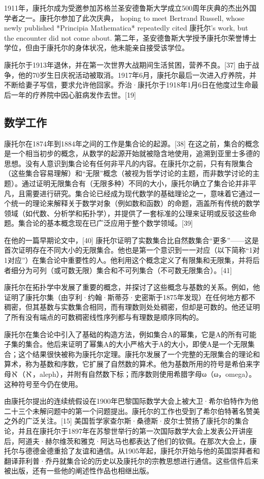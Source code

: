1911年，康托尔成为受邀参加苏格兰圣安德鲁斯大学成立500周年庆典的杰出外国学者之一。康托尔参加了此次庆典， hoping to meet Bertrand Russell, whose newly published *Principia Mathematica* repeatedly cited 康托尔's work, but the encounter did not come about. 第二年，圣安德鲁斯大学授予康托尔荣誉博士学位，但由于康托尔的身体状况，他未能亲自接受该学位。

康托尔于1913年退休，并在第一次世界大战期间生活贫困，营养不良。[37] 由于战争，他的70岁生日庆祝活动被取消。1917年6月，康托尔最后一次进入疗养院，并不断给妻子写信，要求允许他回家。乔治·康托尔于1918年1月6日在他度过生命最后一年的疗养院中因心脏病发作去世。[19]
\subsection{数学工作}  
康托尔在1874年到1884年之间的工作是集合论的起源。[38] 在这之前，集合的概念是一个相当初步的概念，从数学的起源开始就被隐含地使用，追溯到亚里士多德的思想。没有人意识到集合论有任何非平凡的内容。在康托尔之前，只有有限集合（这些集合容易理解）和“无限”概念（被视为哲学讨论的主题，而非数学讨论的主题）。通过证明无限集合有（无限多种）不同的大小，康托尔确立了集合论并非平凡，且需要进行研究。集合论已经成为现代数学的基础理论之一，意味着它通过一个统一的理论来解释关于数学对象（例如数和函数）的命题，涵盖所有传统的数学领域（如代数、分析学和拓扑学），并提供了一套标准的公理来证明或反驳这些命题。集合论的基本概念现在已广泛应用于整个数学领域。[39]

在他的一篇早期论文中，[40] 康托尔证明了实数集合比自然数集合“更多”——这是首次证明存在不同大小的无限集合。他也是第一个意识到一一对应（以下简称“1对1对应”）在集合论中重要性的人。他利用这个概念定义了有限集和无限集，并将后者细分为可列（或可数无限）集合和不可列集合（不可数无限集合）。[41]

康托尔在拓扑学中发展了重要的概念，并探讨了这些概念与基数的关系。例如，他证明了康托尔集（由亨利·约翰·斯蒂芬·史密斯于1875年发现）在任何地方都不稠密，但其基数与实数集合相同，而有理数则处处稠密，但却是可数的。他还证明了所有没有端点的可数稠密线性序列都与有理数是顺序同构的。

康托尔在集合论中引入了基础的构造方法，例如集合A的幂集，它是A的所有可能子集的集合。他后来证明了幂集A的大小严格大于A的大小，即使A是一个无限集合；这个结果很快被称为康托尔定理。康托尔发展了一个完整的无限集合的理论和算术，称为基数和序数，它扩展了自然数的算术。他为基数所用的符号是希伯来字母ℵ（ℵ，aleph），并附有自然数下标；而序数则使用希腊字母ω（ω，omega）。这种符号至今仍在使用。

由康托尔提出的连续统假设在1900年巴黎国际数学大会上被大卫·希尔伯特作为他二十三个未解问题中的第一个问题提出。康托尔的工作也受到了希尔伯特著名赞美之外的广泛关注。[15] 美国哲学家查尔斯·桑德斯·皮尔士赞扬了康托尔的集合论，并且在康托尔于1897年在苏黎世举行的第一次国际数学大会上发表公开讲座后，阿道夫·赫尔维茨和雅克·阿达马也都表达了他们的钦佩。在那次大会上，康托尔与德德金德重拾了友谊和通信。从1905年起，康托尔开始与他的英国崇拜者和翻译菲利普·乔丹就集合论的历史以及康托尔的宗教思想进行通信。这些信件后来被出版，还有一些他的阐述性作品也相继出版。
